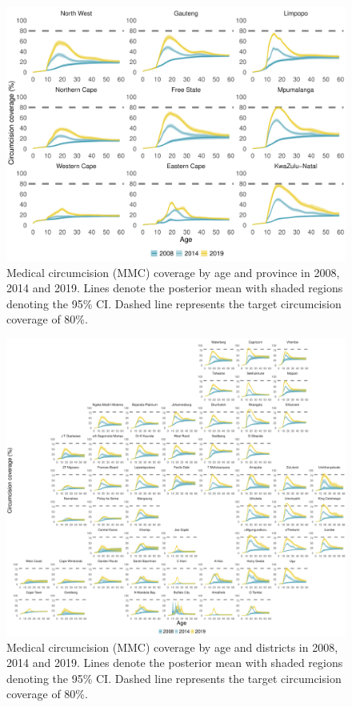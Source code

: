 \documentclass{article}
\begin{document}
\begin{appendix}
\begin{figure}[H]
	\centering
	\includegraphics[width = \linewidth]{Figures/suppmat/Coverage/MMCcoverage_SingleAge_Province.pdf}
	\caption{Medical circumcision (MMC) coverage by age and province in 2008, 2014 and 2019. Lines denote the posterior mean with shaded regions denoting the 95\% CI. Dashed line represents the target circumcision coverage of 80\%.}
\end{figure}	


\begin{figure}[H]
	\centering
	\includegraphics[width = \linewidth]{Figures/suppmat/Coverage/MMCcoverage_SingleAge_District.pdf}
	\caption{Medical circumcision (MMC) coverage by age and districts in 2008, 2014 and 2019. Lines denote the posterior mean with shaded regions denoting the 95\% CI. Dashed line represents the target circumcision coverage of 80\%.}
\end{figure}	


\end{appendix}
\end{document}
